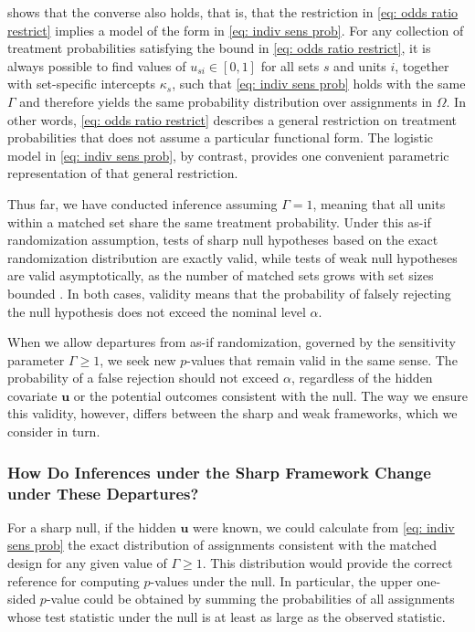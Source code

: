 \documentclass[
  12pt,
  leqno]{article}
\begin{document}
\citet[pp.~1424--1425]{rosenbaum1995a} shows that the converse also
holds, that is, that the restriction in \eqref{eq: odds ratio restrict}
implies a model of the form in \eqref{eq: indiv sens prob}. For any
collection of treatment probabilities satisfying the bound in
\eqref{eq: odds ratio restrict}, it is always possible to find values of
\(u_{si} \in [0,1]\) for all sets \(s\) and units \(i\), together with
set-specific intercepts \(\kappa_s\), such that
\eqref{eq: indiv sens prob} holds with the same \(\Gamma\) and therefore
yields the same probability distribution over assignments in \(\Omega\).
In other words, \eqref{eq: odds ratio restrict} describes a general
restriction on treatment probabilities that does not assume a particular
functional form. The logistic model in \eqref{eq: indiv sens prob}, by
contrast, provides one convenient parametric representation of that
general restriction.

Thus far, we have conducted inference assuming \(\Gamma = 1\), meaning
that all units within a matched set share the same treatment
probability. Under this as-if randomization assumption, tests of sharp
null hypotheses based on the exact randomization distribution are
exactly valid, while tests of weak null hypotheses are valid
asymptotically, as the number of matched sets grows with set sizes
bounded \citep{fogarty2018, fogarty2023}. In both cases, validity means
that the probability of falsely rejecting the null hypothesis does not
exceed the nominal level \(\alpha\).

When we allow departures from as-if randomization, governed by the
sensitivity parameter \(\Gamma \geq 1\), we seek new \(p\)-values that
remain valid in the same sense. The probability of a false rejection
should not exceed \(\alpha\), regardless of the hidden covariate
\(\bm{u}\) or the potential outcomes consistent with the null. The way
we ensure this validity, however, differs between the sharp and weak
frameworks, which we consider in turn.

\subsubsection{How Do Inferences under the Sharp Framework Change under
These
Departures?}\label{how-do-inferences-under-the-sharp-framework-change-under-these-departures}

For a sharp null, if the hidden \(\bm{u}\) were known, we could
calculate from \eqref{eq: indiv sens prob} the exact distribution of
assignments consistent with the matched design for any given value of
\(\Gamma \geq 1\). This distribution would provide the correct reference
for computing \(p\)-values under the null. In particular, the upper
one-sided \(p\)-value could be obtained by summing the probabilities of
all assignments whose test statistic under the null is at least as large
as the observed statistic.
\end{document}
